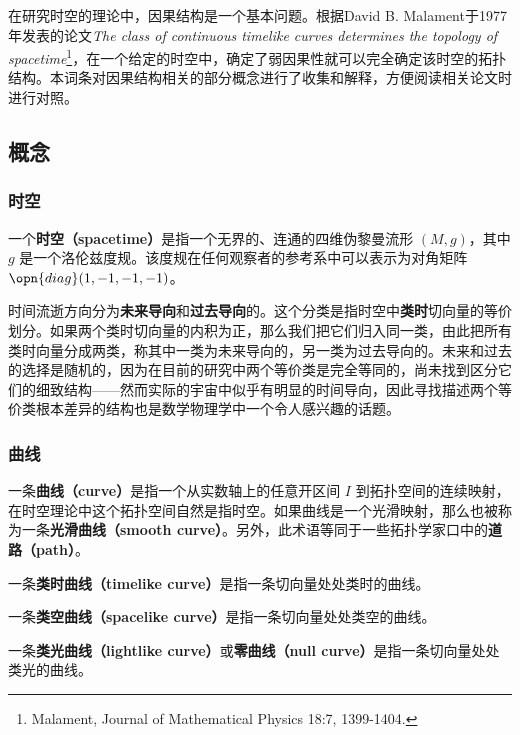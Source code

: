 



在研究时空的理论中，因果结构是一个基本问题。根据David B. Malament于1977年发表的论文\textsl{The class of continuous timelike curves determines the topology of spacetime}\footnote{Malament, Journal of Mathematical Physics 18:7, 1399-1404. }，在一个给定的时空中，确定了弱因果性就可以完全确定该时空的拓扑结构。本词条对因果结构相关的部分概念进行了收集和解释，方便阅读相关论文时进行对照。

\subsection{概念}

\subsubsection{时空}

一个\textbf{时空（spacetime）}是指一个无界的、连通的四维伪黎曼流形 $(M, g)$，其中 $g$ 是一个洛伦兹度规。该度规在任何观察者的参考系中可以表示为对角矩阵 $\opn{diag}(1, -1, -1, -1)$。

时间流逝方向分为\textbf{未来导向}和\textbf{过去导向}的。这个分类是指时空中\textbf{类时}切向量的等价划分。如果两个类时切向量的内积为正，那么我们把它们归入同一类，由此把所有类时向量分成两类，称其中一类为未来导向的，另一类为过去导向的。未来和过去的选择是随机的，因为在目前的研究中两个等价类是完全等同的，尚未找到区分它们的细致结构——然而实际的宇宙中似乎有明显的时间导向，因此寻找描述两个等价类根本差异的结构也是数学物理学中一个令人感兴趣的话题。

\subsubsection{曲线}

一条\textbf{曲线（curve）}是指一个从实数轴上的任意开区间 $I$ 到拓扑空间的连续映射，在时空理论中这个拓扑空间自然是指时空。如果曲线是一个光滑映射，那么也被称为一条\textbf{光滑曲线（smooth curve）}。另外，此术语等同于一些拓扑学家口中的\textbf{道路（path）}。

一条\textbf{类时曲线（timelike curve）}是指一条切向量处处类时的曲线。

一条\textbf{类空曲线（spacelike curve）}是指一条切向量处处类空的曲线。

一条\textbf{类光曲线（lightlike curve）}或\textbf{零曲线（null curve）}是指一条切向量处处类光的曲线。

